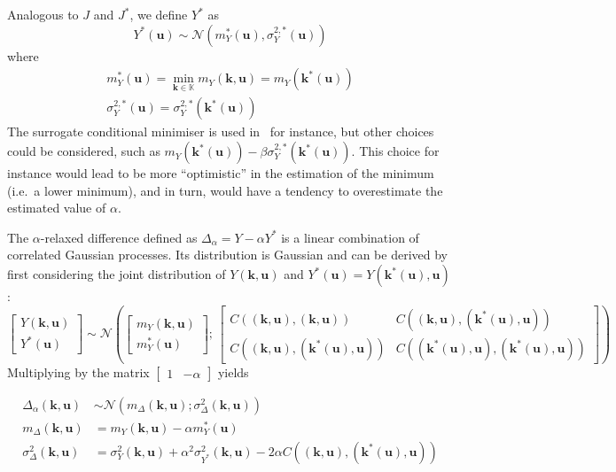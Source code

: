 \documentclass[a4paper,11pt]{article}
\newcommand{\Kspace}{\mathbb{K}}
\newcommand{\kk}{\mathbf{k}}
\newcommand{\uu}{\mathbf{u}}
\theoremstyle{defi}
\numberwithin{thmCounter}{section}
\begin{document}
Analogous to $J$ and $J^*$, we define $Y^*$ as
\begin{equation}
  Y^*(\uu) \sim \mathcal{N}\left(m^*_Y(\uu), \sigma^{2,*}_Y(\uu)\right)
\end{equation}
where
\begin{align}
  m^*_Y(\uu) = \min_{\kk\in\Kspace} m_Y(\kk,\uu) = m_Y(\kk^*(\uu)) \\
  \sigma^{2,*}_Y(\uu) = \sigma^{2,*}_Y(\kk^*(\uu)) 
\end{align}
The surrogate conditional minimiser is used in~\cite{ginsbourger_bayesian_2014} for instance, but other choices could be considered, such as $m_Y(\kk^*(\uu)) - \beta \sigma^{2,*}_Y(\kk^*(\uu))$. This choice for instance would lead to be more ``optimistic'' in the estimation of the minimum (i.e.\ a lower minimum), and in turn, would have a tendency to overestimate the estimated value of $\alpha$.

The $\alpha$-relaxed difference defined as  $\Delta_{\alpha} = Y - \alpha Y^*$ is a linear combination of correlated Gaussian processes. Its distribution is Gaussian and can be derived by first considering the joint distribution of $Y(\kk,\uu)$ and $Y^*(\uu) = Y(\kk^*(\uu), \uu)$:
\begin{equation}
  \begin{bmatrix}
    Y(\kk,\uu) \\
    Y^*(\uu)
  \end{bmatrix}
  \sim \mathcal{N}\left(
    \begin{bmatrix}
      m_Y(\kk,\uu) \\
      m_Y^*(\uu)
    \end{bmatrix}
    ;\,
    \begin{bmatrix}
      C\left((\kk,\uu),(\kk,\uu)\right) & C\left((\kk,\uu),(\kk^*(\uu),\uu)\right) \\
      C\left((\kk,\uu),(\kk^*(\uu),\uu)\right) & C\left((\kk^*(\uu),\uu),(\kk^*(\uu),\uu)\right)
    \end{bmatrix}
\right)
\end{equation}
Multiplying by the matrix $\begin{bmatrix}1 & -\alpha \end{bmatrix}$ yields

\begin{align}
  \Delta_{\alpha}(\kk,\uu) &\sim \mathcal{N}\left(m_{\Delta}(\kk,\uu); \sigma^2_{\Delta}(\kk,\uu)\right)  \label{eq:delta_GP}\\
  m_{\Delta}(\kk,\uu) &= m_Y(\kk,\uu) - \alpha m_Y^*(\uu) \label{eq:mu_delta_GP}\\
  \sigma^2_{\Delta}(\kk,\uu) &= \sigma_Y^2(\kk,\uu) + \alpha^2 \sigma_{Y^*}^2(\kk,\uu) - 2\alpha C\left((\kk,\uu),(\kk^*(\uu),\uu)\right) \label{eq:variance_delta_GP}
\end{align}
\end{document}
